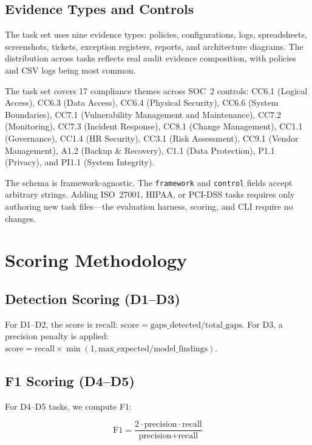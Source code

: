 \documentclass[conference]{IEEEtran}
\begin{document}
\subsection{Evidence Types and Controls}

The task set uses nine evidence types: policies, configurations, logs, spreadsheets, screenshots, tickets, exception registers, reports, and architecture diagrams. The distribution across tasks reflects real audit evidence composition, with policies and CSV logs being most common.

The task set covers 17 compliance themes across SOC~2 controls: CC6.1 (Logical Access), CC6.3 (Data Access), CC6.4 (Physical Security), CC6.6 (System Boundaries), CC7.1 (Vulnerability Management and Maintenance), CC7.2 (Monitoring), CC7.3 (Incident Response), CC8.1 (Change Management), CC1.1 (Governance), CC1.4 (HR Security), CC3.1 (Risk Assessment), CC9.1 (Vendor Management), A1.2 (Backup \& Recovery), C1.1 (Data Protection), P1.1 (Privacy), and PI1.1 (System Integrity).

The schema is framework-agnostic. The \texttt{framework} and \texttt{control} fields accept arbitrary strings. Adding ISO~27001, HIPAA, or PCI-DSS tasks requires only authoring new task files---the evaluation harness, scoring, and CLI require no changes.

\section{Scoring Methodology}

\subsection{Detection Scoring (D1--D3)}

For D1--D2, the score is recall: $\text{score} = \text{gaps\_detected} / \text{total\_gaps}$. For D3, a precision penalty is applied: $\text{score} = \text{recall} \times \min(1, \text{max\_expected} / \text{model\_findings})$.

\subsection{F1 Scoring (D4--D5)}

For D4--D5 tasks, we compute F1:

\begin{equation}
\text{F1} = \frac{2 \cdot \text{precision} \cdot \text{recall}}{\text{precision} + \text{recall}}
\end{equation}
\end{document}
